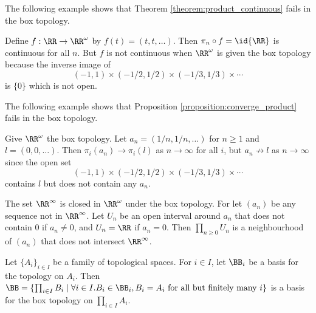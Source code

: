 The following example shows that Theorem \ref{theorem:product_continuous} fails in the box topology.

\begin{example}
    Define $f : \RR \rightarrow \RR^\omega$ by $f(t) = (t, t, \ldots)$. Then $\pi_n \circ f = \id{\RR}$ is continuous for all $n$.
    But $f$ is not continuous when $\RR^\omega$ is given the box topology because the inverse image of
    \[ (-1,1) \times (-1/2, 1/2) \times (-1/3,1/3) \times \cdots \]
    is $\{0\}$ which is not open.
\end{example}

The following example shows that Proposition \ref{proposition:converge_product} fails in the box topology.

\begin{example}
    Give $\RR^\omega$ the box topology. Let $a_n = (1/n, 1/n, \ldots)$ for $n \geq 1$ and $l = (0, 0, \ldots)$. Then $\pi_i(a_n) \rightarrow \pi_i(l)$
    as $n \rightarrow \infty$ for all $i$, but $a_n \not\rightarrow l$ as $n \rightarrow \infty$ since the open set
    \[ (-1,1) \times (-1/2, 1/2) \times (-1/3,1/3) \times \cdots \]
    contains $l$ but does not contain any $a_n$.
\end{example}

\begin{example}
    The set $\RR^\infty$ is closed in $\RR^\omega$ under the box topology. For let $(a_n)$ be any sequence not in $\RR^\infty$.
    Let $U_n$ be an open interval around $a_n$ that does not contain $0$ if $a_n \neq 0$, and $U_n = \RR$ if $a_n = 0$.
    Then $\prod_{n \geq 0} U_n$ is a neighbourhood of $(a_n)$ that does not intersect $\RR^\infty$.
\end{example}

\begin{proposition}
    Let $\{ A_i \}_{i \in I}$ be a family of topological spaces. For $i \in I$, let $\BB_i$ be a basis for the topology on $A_i$. Then $\BB = \{ \prod_{i \in I} B_i \mid
    \forall i \in I. B_i \in \BB_i, B_i = A_i \text{ for all but finitely many } i \}$ is a basis for the box topology on $\prod_{i \in I} A_i$.
\end{proposition}

